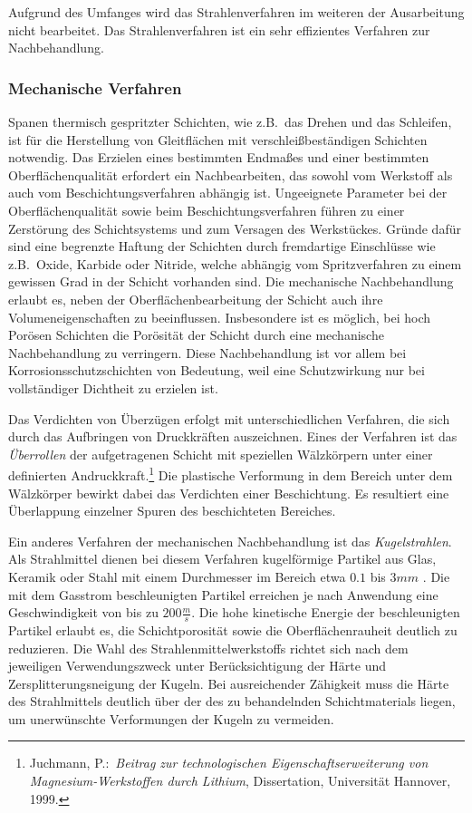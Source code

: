 \documentclass[12pt,a4paper,bibliography=totocnumbered,listof=totocnumbered,fleqn]{scrartcl}
\begin{document}
Aufgrund des Umfanges wird das Strahlenverfahren im weiteren der Ausarbeitung nicht bearbeitet. Das Strahlenverfahren ist ein sehr effizientes Verfahren zur Nachbehandlung.

\subsubsection{Mechanische Verfahren}

Spanen thermisch gespritzter Schichten, wie z.B.\ das Drehen und das Schleifen, ist für die Herstellung von Gleitflächen mit verschleißbeständigen Schichten notwendig. Das Erzielen eines bestimmten Endmaßes und einer bestimmten Oberflächenqualität erfordert ein Nachbearbeiten, das sowohl vom Werkstoff als auch vom Beschichtungsverfahren abhängig ist. Ungeeignete Parameter bei der Oberflächenqualität sowie beim Beschichtungsverfahren führen zu einer Zerstörung des Schichtsystems und zum Versagen des Werkstückes. Gründe dafür sind eine begrenzte Haftung der Schichten durch fremdartige Einschlüsse wie z.B.\ Oxide, Karbide oder Nitride, welche abhängig vom Spritzverfahren zu einem gewissen Grad in der Schicht vorhanden sind. Die mechanische Nachbehandlung erlaubt es, neben der Oberflächenbearbeitung der Schicht auch ihre Volumeneigenschaften zu beeinflussen. Insbesondere ist es möglich, bei hoch Porösen Schichten die Porösität der Schicht durch eine mechanische Nachbehandlung zu verringern. Diese Nachbehandlung ist vor allem bei Korrosionsschutzschichten von Bedeutung, weil eine Schutzwirkung nur bei vollständiger Dichtheit zu erzielen ist. 

Das Verdichten von Überzügen erfolgt mit unterschiedlichen Verfahren, die sich durch das Aufbringen von Druckkräften auszeichnen. Eines der Verfahren ist das \emph{Überrollen} der aufgetragenen Schicht mit speziellen Wälzkörpern unter einer definierten Andruckkraft.\footnote{Juchmann, P.:\ \textit{Beitrag zur technologischen Eigenschaftserweiterung von Magnesium-Werkstoffen durch Lithium}, Dissertation, Universität Hannover, 1999.} Die plastische Verformung in dem Bereich unter dem Wälzkörper bewirkt dabei das Verdichten einer Beschichtung. Es resultiert eine Überlappung einzelner Spuren des beschichteten Bereiches.

Ein anderes Verfahren der mechanischen Nachbehandlung ist das \emph{Kugelstrahlen}. Als Strahlmittel dienen bei diesem Verfahren kugelförmige Partikel aus Glas, Keramik oder Stahl mit einem Durchmesser im Bereich etwa $0.1$ bis $3mm$ \citep{bach2005moderne}. Die mit dem Gasstrom beschleunigten Partikel erreichen je nach Anwendung eine Geschwindigkeit von bis zu $200\frac{m}{s}$. Die hohe kinetische Energie der beschleunigten Partikel erlaubt es, die Schichtporosität sowie die Oberflächenrauheit deutlich zu reduzieren. Die Wahl des Strahlenmittelwerkstoffs richtet sich nach dem jeweiligen Verwendungszweck unter Berücksichtigung der Härte und Zersplitterungsneigung der Kugeln. Bei ausreichender Zähigkeit muss die Härte des Strahlmittels deutlich über der des zu behandelnden Schichtmaterials liegen, um unerwünschte Verformungen der Kugeln zu vermeiden.
\end{document}
